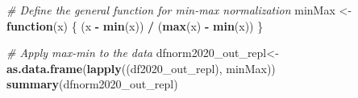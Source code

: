 \documentclass[
]{article}
\newenvironment{Shaded}{\begin{snugshade}}{\end{snugshade}}
\newcommand{\CommentTok}[1]{\textcolor[rgb]{0.56,0.35,0.01}{\textit{#1}}}
\newcommand{\ControlFlowTok}[1]{\textcolor[rgb]{0.13,0.29,0.53}{\textbf{#1}}}
\newcommand{\FunctionTok}[1]{\textcolor[rgb]{0.13,0.29,0.53}{\textbf{#1}}}
\newcommand{\NormalTok}[1]{#1}
\newcommand{\OtherTok}[1]{\textcolor[rgb]{0.56,0.35,0.01}{#1}}
\newcommand{\SpecialCharTok}[1]{\textcolor[rgb]{0.81,0.36,0.00}{\textbf{#1}}}
\begin{document}
\begin{Shaded}
\begin{Highlighting}[]
\CommentTok{\# Define the general function for min{-}max normalization}
\NormalTok{minMax }\OtherTok{\textless{}{-}} \ControlFlowTok{function}\NormalTok{(x) \{}
\NormalTok{  (x }\SpecialCharTok{{-}} \FunctionTok{min}\NormalTok{(x)) }\SpecialCharTok{/}\NormalTok{ (}\FunctionTok{max}\NormalTok{(x) }\SpecialCharTok{{-}} \FunctionTok{min}\NormalTok{(x))}
\NormalTok{\}}

\CommentTok{\# Apply max{-}min to the data}
\NormalTok{dfnorm2020\_out\_repl}\OtherTok{\textless{}{-}} \FunctionTok{as.data.frame}\NormalTok{(}\FunctionTok{lapply}\NormalTok{((df2020\_out\_repl), minMax))}
\FunctionTok{summary}\NormalTok{(dfnorm2020\_out\_repl)}
\end{Highlighting}
\end{Shaded}
\end{document}
